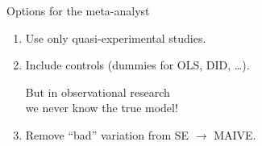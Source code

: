 \documentclass{beamer} %
\begin{document}
\begin{frame}{Options for the meta-analyst}
\begin{enumerate}
	\item Use only quasi-experimental studies. %
	\item Include controls (dummies for OLS, DID, \ldots). %
	
	\bigskip 
	
	But in observational research \\ \alert{we never know the true model!} %
	
	\bigskip
	
	\item Remove ``bad'' variation from SE $\rightarrow$ MAIVE.
\end{enumerate}



\end{frame}
\end{document}

